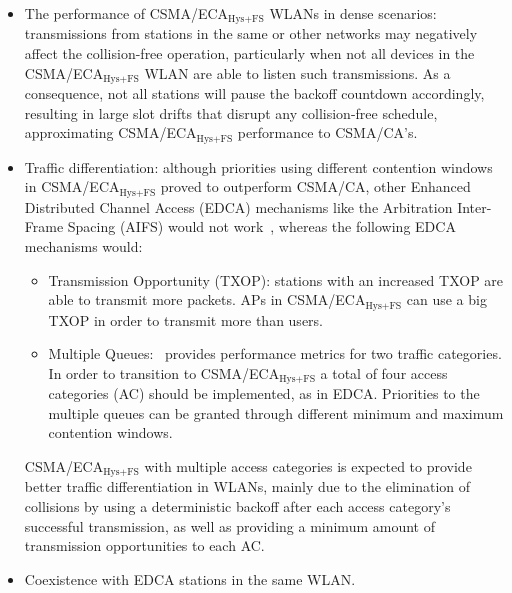 \begin{itemize}
	\item The performance of CSMA/ECA$_{\text{Hys+FS}}$ WLANs in dense scenarios: transmissions from stations in the same or other networks may negatively affect the collision-free operation, particularly when not all devices in the CSMA/ECA$_{\text{Hys+FS}}$ WLAN are able to listen such transmissions. As a consequence, not all stations will pause the backoff countdown accordingly, resulting in large slot drifts that disrupt any collision-free schedule, approximating CSMA/ECA$_{\text{Hys+FS}}$ performance to CSMA/CA's. 

	
	\item Traffic differentiation: although priorities using different contention windows in CSMA/ECA$_{\text{Hys+FS}}$ proved to outperform CSMA/CA, other Enhanced Distributed Channel Access (EDCA) mechanisms like the Arbitration Inter-Frame Spacing (AIFS) would not work~\cite{jaumeTD}, whereas the following EDCA mechanisms would:
	\begin{itemize}
		\item Transmission Opportunity (TXOP): stations with an increased TXOP are able to transmit more packets. APs in CSMA/ECA$_{\text{Hys+FS}}$ can use a big TXOP in order to transmit more than users.
		\item Multiple Queues:~\cite{jaumeTD} provides performance metrics for two traffic categories. In order to transition to CSMA/ECA$_{\text{Hys+FS}}$ a total of four access categories (AC) should be implemented, as in EDCA. Priorities to the multiple queues can be granted through different minimum and maximum contention windows.
	\end{itemize}
	CSMA/ECA$_{\text{Hys+FS}}$ with multiple access categories is expected to provide better traffic differentiation in WLANs, mainly due to the elimination of collisions by using a deterministic backoff after each access category's successful transmission, as well as providing a minimum amount of transmission opportunities to each AC.
	\item Coexistence with EDCA stations in the same WLAN.
\end{itemize}